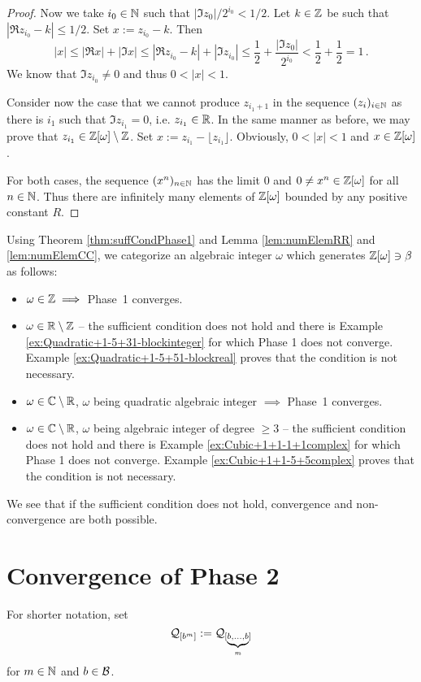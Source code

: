 \begin{proof}
Now we take $i_0\in\mathbb{N}$ such that $|\Im z_0|/2^{i_0}< 1/2$. Let $k\in\mathbb{Z}$ be such that $|\Re z_{i_0} -k|\leq 1/2$. Set $x:= z_{i_0}-k$. Then
$$
|x|\leq |\Re x| +|\Im x| \leq  |\Re z_{i_0} -k| + |\Im z_{i_0}| \leq \frac{1}{2} + \frac{|\Im z_0|}{2^{i_0}} < \frac{1}{2} +\frac{1}{2}=1\,.
$$
We know that $\Im z_{i_0} \neq 0$ and thus $0<|x|<1$.

Consider now the case that we cannot produce $z_{i_1+1}$  in the sequence $(z_i)_{i\in\mathbb{N}}$ as there is ${i_1}$ such that $\Im z_{i_1} = 0$, i.e. $z_{i_1}\in\mathbb{R}$. In the same manner as before, we may prove that  $z_{i_1} \in \mathbb{Z}[\omega]\setminus \mathbb{Z}$. Set $x:= z_{i_1}- \lfloor z_{i_1} \rfloor$. Obviously, $0<|x|<1$ and $x\in\mathbb{Z}[\omega]$.

For both cases, the sequence $(x^n)_{n\in\mathbb{N}}$ has the limit 0 and $0\neq x^n\in\mathbb{Z}[\omega]$ for all $n\in\mathbb{N}$. Thus there are infinitely many elements of $\mathbb{Z}[\omega]$ bounded by any positive constant $R$. 
\end{proof}


Using Theorem \ref{thm:suffCondPhase1} and Lemma \ref{lem:numElemRR} and \ref{lem:numElemCC}, we categorize an algebraic integer $\omega$ which generates $\mathbb{Z}[\omega] \ni \beta$ as follows:

\begin{itemize}
    \item $\omega \in \mathbb{Z} \implies$ Phase~1 converges.
    \item $\omega \in \mathbb{R}\setminus\mathbb{Z}$ -- the sufficient condition does not hold and there is  Example \ref{ex:Quadratic+1-5+31-blockinteger} for which Phase 1 does not converge.  Example \ref{ex:Quadratic+1-5+51-blockreal} proves that the condition is not necessary.
    \item $\omega \in \mathbb{C}\setminus\mathbb{R}$, $\omega$ being quadratic algebraic integer $\implies$ Phase~1 converges.
    \item $\omega \in \mathbb{C}\setminus\mathbb{R}$, $\omega$ being algebraic integer of degree $\geq 3$ -- the sufficient condition does not hold and there is  Example \ref{ex:Cubic+1+1-1+1complex} for which Phase 1 does not converge. Example \ref{ex:Cubic+1+1-5+5complex} proves that the condition is not necessary.
\end{itemize}
We see that if the sufficient condition does not hold, convergence and non-convergence are both possible.


\newpage
\section{Convergence of Phase 2}
\label{sec:convergencePhase2}
For shorter notation, set 
$$
\mathcal{Q}_{[b^{m}]}:=\mathcal{Q}_{[\underbrace{\scriptstyle b,\dots,b}_m]}
$$ for $m \in \mathbb{N}$ and $b\in\mathcal{B}$.

